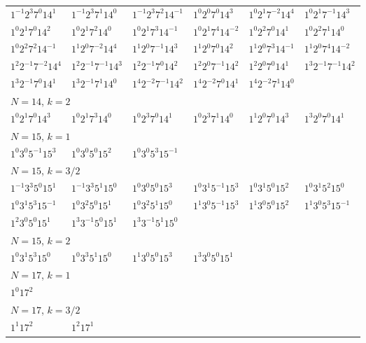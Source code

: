 \documentclass[12pt]{amsart}
\numberwithin{equation}{section}
\theoremstyle{plain}
\theoremstyle{definition}
\theoremstyle{remark}
\begin{document}
\begin{longtable}{llllll}
$1^{-1}2^{3}7^{0}14^{1}$ & $1^{-1}2^{3}7^{1}14^{0}$ & $1^{-1}2^{3}7^{2}14^{-1}$ & $1^{0}2^{0}7^{0}14^{3}$ & $1^{0}2^{1}7^{-2}14^{4}$ & $1^{0}2^{1}7^{-1}14^{3}$\\
$1^{0}2^{1}7^{0}14^{2}$ & $1^{0}2^{1}7^{2}14^{0}$ & $1^{0}2^{1}7^{3}14^{-1}$ & $1^{0}2^{1}7^{4}14^{-2}$ & $1^{0}2^{2}7^{0}14^{1}$ & $1^{0}2^{2}7^{1}14^{0}$\\
$1^{0}2^{2}7^{2}14^{-1}$ & $1^{1}2^{0}7^{-2}14^{4}$ & $1^{1}2^{0}7^{-1}14^{3}$ & $1^{1}2^{0}7^{0}14^{2}$ & $1^{1}2^{0}7^{3}14^{-1}$ & $1^{1}2^{0}7^{4}14^{-2}$\\
$1^{2}2^{-1}7^{-2}14^{4}$ & $1^{2}2^{-1}7^{-1}14^{3}$ & $1^{2}2^{-1}7^{0}14^{2}$ & $1^{2}2^{0}7^{-1}14^{2}$ & $1^{2}2^{0}7^{0}14^{1}$ & $1^{3}2^{-1}7^{-1}14^{2}$\\
$1^{3}2^{-1}7^{0}14^{1}$ & $1^{3}2^{-1}7^{1}14^{0}$ & $1^{4}2^{-2}7^{-1}14^{2}$ & $1^{4}2^{-2}7^{0}14^{1}$ & $1^{4}2^{-2}7^{1}14^{0}$ & \\
\midrule
\multicolumn{6}{l}{$N=14$, $k=2$}\\
$1^{0}2^{1}7^{0}14^{3}$ & $1^{0}2^{1}7^{3}14^{0}$ & $1^{0}2^{3}7^{0}14^{1}$ & $1^{0}2^{3}7^{1}14^{0}$ & $1^{1}2^{0}7^{0}14^{3}$ & $1^{3}2^{0}7^{0}14^{1}$\\
\midrule
\multicolumn{6}{l}{$N=15$, $k=1$}\\
$1^{0}3^{0}5^{-1}15^{3}$ & $1^{0}3^{0}5^{0}15^{2}$ & $1^{0}3^{0}5^{3}15^{-1}$ & &&\\
\midrule
\multicolumn{6}{l}{$N=15$, $k=3/2$}\\
$1^{-1}3^{3}5^{0}15^{1}$ & $1^{-1}3^{3}5^{1}15^{0}$ & $1^{0}3^{0}5^{0}15^{3}$ & $1^{0}3^{1}5^{-1}15^{3}$ & $1^{0}3^{1}5^{0}15^{2}$ & $1^{0}3^{1}5^{2}15^{0}$\\
$1^{0}3^{1}5^{3}15^{-1}$ & $1^{0}3^{2}5^{0}15^{1}$ & $1^{0}3^{2}5^{1}15^{0}$ & $1^{1}3^{0}5^{-1}15^{3}$ & $1^{1}3^{0}5^{0}15^{2}$ & $1^{1}3^{0}5^{3}15^{-1}$\\
$1^{2}3^{0}5^{0}15^{1}$ & $1^{3}3^{-1}5^{0}15^{1}$ & $1^{3}3^{-1}5^{1}15^{0}$ & &&\\
\midrule
\multicolumn{6}{l}{$N=15$, $k=2$}\\
$1^{0}3^{1}5^{3}15^{0}$ & $1^{0}3^{3}5^{1}15^{0}$ & $1^{1}3^{0}5^{0}15^{3}$ & $1^{3}3^{0}5^{0}15^{1}$ & &\\
\midrule
\multicolumn{6}{l}{$N=17$, $k=1$}\\
$1^{0}17^{2}$ & &&&&\\
\midrule
\multicolumn{6}{l}{$N=17$, $k=3/2$}\\
$1^{1}17^{2}$ & $1^{2}17^{1}$ & &&&\\

\end{longtable}
\end{document}
